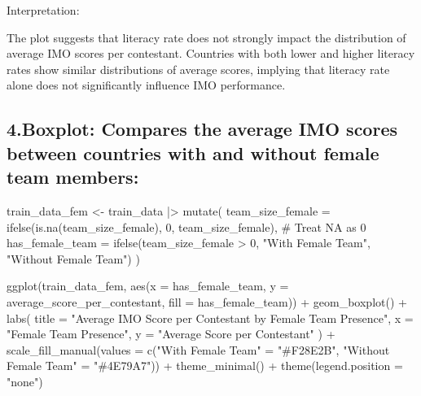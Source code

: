 \documentclass[
  letterpaper,
  DIV=11,
  numbers=noendperiod]{scrartcl}
\newenvironment{Shaded}{\begin{snugshade}}{\end{snugshade}}
\newcommand{\AttributeTok}[1]{\textcolor[rgb]{0.40,0.45,0.13}{#1}}
\newcommand{\CommentTok}[1]{\textcolor[rgb]{0.37,0.37,0.37}{#1}}
\newcommand{\DecValTok}[1]{\textcolor[rgb]{0.68,0.00,0.00}{#1}}
\newcommand{\FunctionTok}[1]{\textcolor[rgb]{0.28,0.35,0.67}{#1}}
\newcommand{\NormalTok}[1]{\textcolor[rgb]{0.00,0.23,0.31}{#1}}
\newcommand{\OtherTok}[1]{\textcolor[rgb]{0.00,0.23,0.31}{#1}}
\newcommand{\SpecialCharTok}[1]{\textcolor[rgb]{0.37,0.37,0.37}{#1}}
\newcommand{\StringTok}[1]{\textcolor[rgb]{0.13,0.47,0.30}{#1}}
\begin{document}
Interpretation:

The plot suggests that literacy rate does not strongly impact the
distribution of average IMO scores per contestant. Countries with both
lower and higher literacy rates show similar distributions of average
scores, implying that literacy rate alone does not significantly
influence IMO performance.

\subsection{4.Boxplot: Compares the average IMO scores between countries
with and without female team
members:}\label{boxplot-compares-the-average-imo-scores-between-countries-with-and-without-female-team-members}

\begin{Shaded}
\begin{Highlighting}[]
\NormalTok{train\_data\_fem }\OtherTok{\textless{}{-}}\NormalTok{ train\_data }\SpecialCharTok{|\textgreater{}}
  \FunctionTok{mutate}\NormalTok{(}
    \AttributeTok{team\_size\_female =} \FunctionTok{ifelse}\NormalTok{(}\FunctionTok{is.na}\NormalTok{(team\_size\_female), }\DecValTok{0}\NormalTok{, team\_size\_female), }\CommentTok{\# Treat NA as 0}
    \AttributeTok{has\_female\_team =} \FunctionTok{ifelse}\NormalTok{(team\_size\_female }\SpecialCharTok{\textgreater{}} \DecValTok{0}\NormalTok{, }\StringTok{"With Female Team"}\NormalTok{, }\StringTok{"Without Female Team"}\NormalTok{)}
\NormalTok{  )}

\FunctionTok{ggplot}\NormalTok{(train\_data\_fem, }\FunctionTok{aes}\NormalTok{(}\AttributeTok{x =}\NormalTok{ has\_female\_team, }\AttributeTok{y =}\NormalTok{ average\_score\_per\_contestant, }\AttributeTok{fill =}\NormalTok{ has\_female\_team)) }\SpecialCharTok{+}
  \FunctionTok{geom\_boxplot}\NormalTok{() }\SpecialCharTok{+}
  \FunctionTok{labs}\NormalTok{(}
    \AttributeTok{title =} \StringTok{"Average IMO Score per Contestant by Female Team Presence"}\NormalTok{,}
    \AttributeTok{x =} \StringTok{"Female Team Presence"}\NormalTok{,}
    \AttributeTok{y =} \StringTok{"Average Score per Contestant"}
\NormalTok{  ) }\SpecialCharTok{+}
  \FunctionTok{scale\_fill\_manual}\NormalTok{(}\AttributeTok{values =} \FunctionTok{c}\NormalTok{(}\StringTok{"With Female Team"} \OtherTok{=} \StringTok{"\#F28E2B"}\NormalTok{, }\StringTok{"Without Female Team"} \OtherTok{=} \StringTok{"\#4E79A7"}\NormalTok{)) }\SpecialCharTok{+}
  \FunctionTok{theme\_minimal}\NormalTok{() }\SpecialCharTok{+}
  \FunctionTok{theme}\NormalTok{(}\AttributeTok{legend.position =} \StringTok{"none"}\NormalTok{)}
\end{Highlighting}
\end{Shaded}
\end{document}
